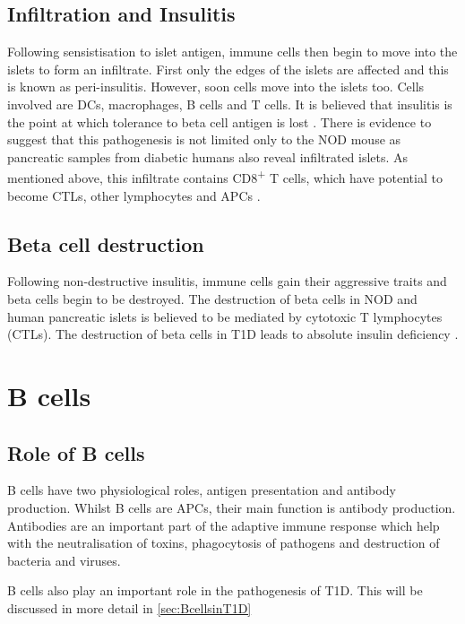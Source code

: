 \subsection{Infiltration and Insulitis}

Following sensistisation to islet antigen, immune cells then begin to move into the islets to form an infiltrate.
First only the edges of the islets are affected and this is known as peri-insulitis\citep{Thomas2000}.
However, soon cells move into the islets too.
Cells involved are DCs, macrophages, B cells and T cells\citep{Brodie2008}.
It is believed that insulitis is the point at which tolerance to beta cell antigen is lost \citep{Thomas2000}.
There is evidence to suggest that this pathogenesis is not limited only to the NOD mouse as pancreatic samples from diabetic humans also reveal infiltrated islets.
As mentioned above, this infiltrate contains CD8\textsuperscript{+} T cells, which have potential to become CTLs, other lymphocytes and APCs \citep{Hanafusa2008}.

\subsection{Beta cell destruction}

Following non-destructive insulitis, immune cells gain their aggressive traits and beta cells begin to be destroyed.
The destruction of beta cells in NOD and human pancreatic islets is believed to be mediated by cytotoxic T lymphocytes (CTLs)\citep{Thomas2000, Brodie2008, Hanafusa2008}.
The destruction of beta cells in T1D leads to absolute insulin deficiency \citep{Daneman2006}.

\section{B cells}
\subsection{Role of B cells}
\label{subsec:Bcellrole}
B cells have two physiological roles, antigen presentation and antibody production.
Whilst B cells are APCs, their main function is antibody production.
Antibodies are an important part of the adaptive immune response which help with the neutralisation of toxins, phagocytosis of pathogens and destruction of bacteria and viruses.

B cells also play an important role in the pathogenesis of T1D. 
This will be discussed in more detail in \cref{sec:BcellsinT1D}

